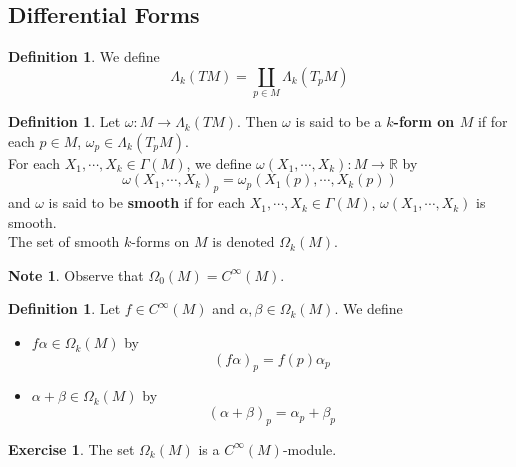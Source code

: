 \documentclass[12pt]{amsart}
\theoremstyle{definition}
\newtheorem{defn}[definition]{Definition}
\newtheorem{note}[definition]{Note}
\theoremstyle{definition}
\newtheorem{ex}[definition]{Exercise}
\newcommand{\al}{\alpha}
\newcommand{\Gam}{\Gamma}
\newcommand{\bet}{\beta}
\newcommand{\Lam}{\Lambda}
\newcommand{\om}{\omega}
\newcommand{\Om}{\Omega}
\newcommand{\R}{\mathbb{R}}
\begin{document}
	
	
	
	
	
	
	
	
	
	
	
	
	
	
	
	
	
	
	
	
	
	

	
	\newpage	
	\subsection{Differential Forms}
	
	\begin{defn}
		We define $$\Lam_k (TM) = \coprod_{p \in M} \Lam_k(T_p M)$$
	\end{defn}
	
	\begin{defn}
		Let $\om: M \rightarrow \Lam_k (TM)$. Then $\om$ is said to be a \textbf{$k$-form on $M$} if for each $p \in M$, $\om_p \in \Lam_k(T_pM)$.\\
		For each $X_1, \cdots, X_k \in \Gam(M)$, we define $\om(X_1, \cdots, X_k) : M \rightarrow \R$ by $$\om(X_1, \cdots, X_k)_p = \om_p({X_1}(p), \cdots, {X_k}(p))$$
		and $\om$ is said to be \textbf{smooth} if for each $X_1, \cdots, X_k \in \Gam(M)$, $\om(X_1, \cdots, X_k)$ is smooth.\\
		The set of smooth $k$-forms on $M$ is denoted $\Om_k(M)$.\\
	\end{defn} 

	\begin{note}
		Observe that $\Om_0(M) = C^{\infty}(M)$.
	\end{note}
	
	\begin{defn}
	Let $f \in C^{\infty}(M)$ and $\al, \bet \in \Om_k(M)$. We define 
	\begin{itemize}
	\item $f \al \in \Om_k(M)$ by $$(f\al)_p = f(p)\al_p$$
	\item $\al+\bet \in \Om_k(M)$ by $$(\al+\bet)_p = \al_p+\bet_p$$
	\end{itemize}
	\end{defn}	
	
	\begin{ex}
	The set $\Om_k(M)$ is a $C^{\infty}(M)$-module.
	\end{ex}
	
\end{document}
